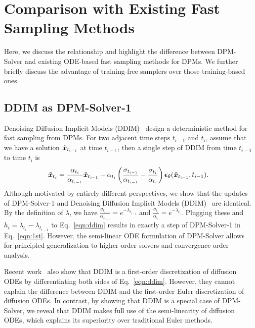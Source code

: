 \section{Comparison with Existing Fast Sampling Methods}

Here, we discuss the relationship and highlight the difference between DPM-Solver and existing ODE-based fast sampling methods for DPMs. We further briefly discuss the advantage of training-free samplers over those training-based ones. 

\subsection{DDIM as DPM-Solver-1}
\label{sec:ddim}

Denoising Diffusion Implicit Models (DDIM)~\citep{song2020denoising} design a deterministic method for fast sampling from DPMs. For two adjacent time steps $t_{i-1}$ and $t_{i}$, assume that we have a solution $\tilde{\bm{x}}_{t_{i-1}}$ at time $t_{i-1}$, then a single step of DDIM from time $t_{i-1}$ to time $t_i$ is
\begin{equation}
\label{eqn:ddim}
    \tilde{\bm{x}}_{t_i} = \frac{\alpha_{t_i}}{\alpha_{t_{i-1}}}\tilde{\bm{x}}_{t_{i-1}} - \alpha_{t_i}\left(\frac{\sigma_{t_{i-1}}}{\alpha_{t_{i-1}}} - \frac{\sigma_{t_i}}{\alpha_{t_i}}\right)\bm{\epsilon}_\theta(\tilde{\bm{x}}_{t_{i-1}},t_{i-1}).
\end{equation}
Although motivated by entirely different perspectives, we show that the updates of DPM-Solver-1 and Denoising Diffusion Implicit Models (DDIM)~\citep{song2020denoising} are identical. 
By the definition of $\lambda$, we have $\frac{\sigma_{t_{i-1}}}{\alpha_{t_{i-1}}}=e^{-\lambda_{t_{i-1}}}$ and $\frac{\sigma_{t_{i}}}{\alpha_{t_{i}}}=e^{-\lambda_{t_{i}}}$. Plugging these and $h_i= \lambda_{t_i} - \lambda_{t_{i-1}}$ to Eq.~\eqref{eqn:ddim}
results in exactly a step of DPM-Solver-1 in Eq.~\eqref{eqn:1st}.
However, the semi-linear ODE formulation of DPM-Solver allows for principled  generalization to higher-order solvers and convergence order analysis. 



Recent work~\citep{salimans2022progressive} also show that DDIM is a first-order discretization of diffusion ODEs by differentiating  both sides of Eq.~\eqref{eqn:ddim}. However, they cannot explain the difference between DDIM and the first-order Euler discretization of diffusion ODEs. 
In contrast, by showing that DDIM is a special case of DPM-Solver, we reveal that DDIM makes full use of the semi-linearity of diffusion ODEs, which explains its superiority over traditional Euler methods.







